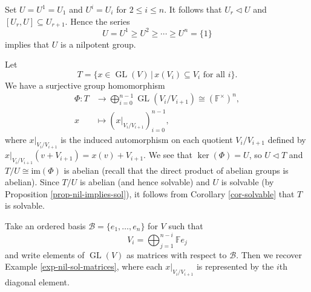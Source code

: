 \begin{example}
	Set $U = U^1 = U_1$ and $U^i = U_i$ for $2\leq i\leq n$. It follows that $U_r \lhd U$ and $[U_r, U] \subseteq U_{r+1}$.  Hence the series
	\begin{equation*}
		U = U^1 \geq U^2\geq \cdots \geq U^n = \{1\}
	\end{equation*} implies that $U$ is a nilpotent group.
	
	Let
	\begin{equation*}
		T = \{x \in \operatorname{GL}(V) \,|\,  x(V_i) \subseteq V_i\text{ for all }i\}.
	\end{equation*} We have a surjective group homomorphism
	\begin{align*}
		\Phi:T&\rightarrow \bigoplus_{i=0}^{n-1} \operatorname{GL}(V_i/V_{i+1}) \cong (\mathbb{F}^\times)^n,
		\\
		x &\mapsto (x|_{V_i/V_{i+1}})_{i=0}^{n-1},
	\end{align*}
	where  $x|_{V_i/V_{i+1}}$ is the induced automorphism on each quotient $V_i/V_{i+1}$ defined by $x|_{V_i/V_{i+1}}(v+V_{i+1}) = x(v) + V_{i+1}$. We see that $\operatorname{ker}(\Phi) = U$, so $U \lhd T$ and $T/U \cong \text{im}(\Phi)$ is abelian (recall that the direct product of abelian groups is abelian). Since $T/U$ is abelian (and hence solvable) and $U$ is solvable (by Proposition \ref{prop-nil-implies-sol}), it follows from Corollary \ref{cor-solvable} that $T$ is solvable.
	
	Take an ordered basis $\mathcal{B} = \{e_1, \ldots, e_n\}$ for $V$ such that
	$$V_i = \bigoplus_{j=1  }^{n-i} \mathbb{F}e_j$$
	and write elements of $\operatorname{GL}(V)$ as matrices with respect  to $\mathcal{B}$. Then we recover Example \ref{exp-nil-sol-matrices}, where each $x|_{V_i/V_{i+1}}$ is represented by the $i$th diagonal element. 
\end{example}

